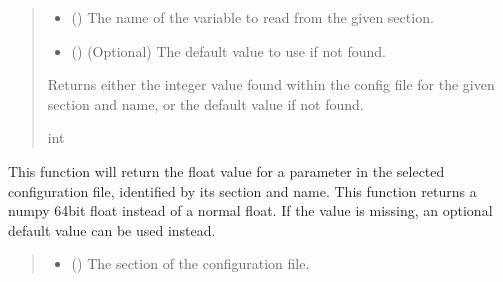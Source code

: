 \documentclass[letterpaper,10pt,english]{sphinxmanual}
\begin{document}
\begin{fulllineitems}
\begin{fulllineitems}
\begin{quote}
\begin{description}
\begin{itemize}
\item {} 
\sphinxAtStartPar
{} () \textendash{} The name of the variable to read from the given section.

\item {} 
\sphinxAtStartPar
{} () \textendash{} (Optional) The default value to use if not found.

\end{itemize}

\sphinxAtStartPar
Returns either the integer value found within the config file
for the given section and name, or the default value if not found.

\sphinxAtStartPar
int

\end{description}\end{quote}

\end{fulllineitems}


\begin{fulllineitems}
\label{\detokenize{modules/input/config_handler:qnav.input.config_handler.ConfigHandler.get_float}}
\pysigstartsignatures
{}
\pysigstopsignatures
\sphinxAtStartPar
This function will return the float value for a parameter in the
selected configuration file, identified by its section and name.
This function returns a numpy 64\sphinxhyphen{}bit float instead of a normal float.
If the value is missing, an optional default value can be used instead.
\begin{quote}\begin{description}
\begin{itemize}
\item {} 
\sphinxAtStartPar
{} () \textendash{} The section of the configuration file.


\end{itemize}
\end{description}
\end{quote}
\end{fulllineitems}
\end{fulllineitems}
\end{document}

